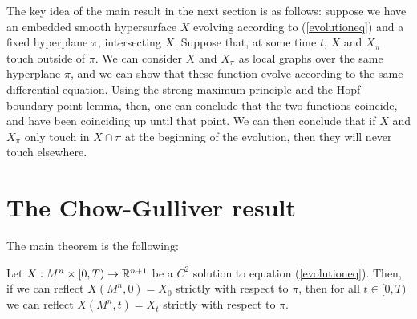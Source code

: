 The key idea of the main result in the next section is as follows: suppose we have an embedded smooth hypersurface $X$ evolving according to (\ref{evolutioneq}) and a fixed hyperplane $\pi$, intersecting $X$. Suppose that, at some time $t$, $X$ and  $X_\pi$ touch outside of $\pi$. We can consider $X$ and  $X_\pi$ as local graphs over the same hyperplane $\pi$, and we can show that these function evolve according to the same differential equation. Using the strong maximum principle and the Hopf boundary point lemma, then, one can conclude that the two functions coincide, and have been coinciding up until that point. We can then conclude that if  $X$ and  $X_\pi$ only touch in $X\cap\pi$ at the beginning of the evolution, then they will never touch elsewhere.  


\section{The Chow-Gulliver result}\label{main theorem section}

The main theorem is the following: 

\begin{theorem}\label{chow gulliver}
	Let $X:M^n\times [0,T) \rightarrow \mathbb{R}^{n+1}$ be a $C^2$ solution to equation (\ref{evolutioneq}). Then, if we can reflect $X(M^n, 0)=X_0$ strictly with respect to $\pi$, then for all $t\in [0,T)$ we can reflect $X(M^n, t)=X_t$ strictly with respect to $\pi$. 
\end{theorem}

